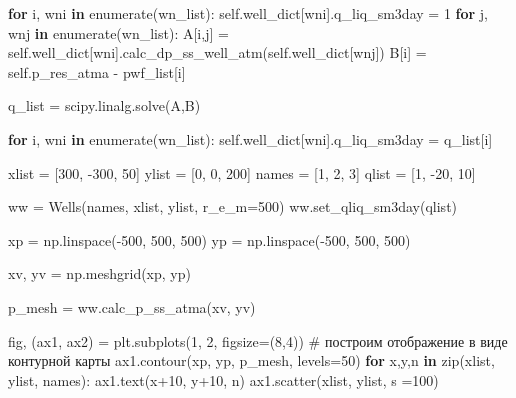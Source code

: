 \documentclass[
  russian,
  letterpaper,
  DIV=11,
  numbers=noendperiod,
  oneside]{scrartcl}
\newenvironment{Shaded}{\begin{snugshade}}{\end{snugshade}}
\newcommand{\BuiltInTok}[1]{\textcolor[rgb]{0.00,0.23,0.31}{#1}}
\newcommand{\CommentTok}[1]{\textcolor[rgb]{0.37,0.37,0.37}{#1}}
\newcommand{\ControlFlowTok}[1]{\textcolor[rgb]{0.00,0.23,0.31}{\textbf{#1}}}
\newcommand{\DecValTok}[1]{\textcolor[rgb]{0.68,0.00,0.00}{#1}}
\newcommand{\KeywordTok}[1]{\textcolor[rgb]{0.00,0.23,0.31}{\textbf{#1}}}
\newcommand{\NormalTok}[1]{\textcolor[rgb]{0.00,0.23,0.31}{#1}}
\newcommand{\OperatorTok}[1]{\textcolor[rgb]{0.37,0.37,0.37}{#1}}
\newcommand{\StringTok}[1]{\textcolor[rgb]{0.13,0.47,0.30}{#1}}
\newcommand{\VariableTok}[1]{\textcolor[rgb]{0.07,0.07,0.07}{#1}}
\begin{document}
\begin{Shaded}
\begin{Highlighting}[]
        \ControlFlowTok{for}\NormalTok{ i, wni }\KeywordTok{in} \BuiltInTok{enumerate}\NormalTok{(wn\_list):}
            \VariableTok{self}\NormalTok{.well\_dict[wni].q\_liq\_sm3day }\OperatorTok{=} \DecValTok{1}
            \ControlFlowTok{for}\NormalTok{ j, wnj }\KeywordTok{in} \BuiltInTok{enumerate}\NormalTok{(wn\_list):}
\NormalTok{                A[i,j] }\OperatorTok{=} \VariableTok{self}\NormalTok{.well\_dict[wni].calc\_dp\_ss\_well\_atm(}\VariableTok{self}\NormalTok{.well\_dict[wnj])}
\NormalTok{            B[i] }\OperatorTok{=} \VariableTok{self}\NormalTok{.p\_res\_atma }\OperatorTok{{-}}\NormalTok{ pwf\_list[i]}
        
\NormalTok{        q\_list }\OperatorTok{=}\NormalTok{ scipy.linalg.solve(A,B)}

        \ControlFlowTok{for}\NormalTok{ i, wni }\KeywordTok{in} \BuiltInTok{enumerate}\NormalTok{(wn\_list):}
            \VariableTok{self}\NormalTok{.well\_dict[wni].q\_liq\_sm3day }\OperatorTok{=}\NormalTok{ q\_list[i]}

\NormalTok{xlist }\OperatorTok{=}\NormalTok{ [}\DecValTok{300}\NormalTok{, }\OperatorTok{{-}}\DecValTok{300}\NormalTok{, }\DecValTok{50}\NormalTok{]}
\NormalTok{ylist }\OperatorTok{=}\NormalTok{ [}\DecValTok{0}\NormalTok{, }\DecValTok{0}\NormalTok{, }\DecValTok{200}\NormalTok{]}
\NormalTok{names }\OperatorTok{=}\NormalTok{ [}\StringTok{\textquotesingle{}1\textquotesingle{}}\NormalTok{, }\StringTok{\textquotesingle{}2\textquotesingle{}}\NormalTok{, }\StringTok{\textquotesingle{}3\textquotesingle{}}\NormalTok{]}
\NormalTok{qlist }\OperatorTok{=}\NormalTok{ [}\DecValTok{1}\NormalTok{, }\OperatorTok{{-}}\DecValTok{20}\NormalTok{, }\DecValTok{10}\NormalTok{]}

\NormalTok{ww }\OperatorTok{=}\NormalTok{ Wells(names, xlist, ylist, r\_e\_m}\OperatorTok{=}\DecValTok{500}\NormalTok{)}
\NormalTok{ww.set\_qliq\_sm3day(qlist)}

\NormalTok{xp }\OperatorTok{=}\NormalTok{ np.linspace(}\OperatorTok{{-}}\DecValTok{500}\NormalTok{, }\DecValTok{500}\NormalTok{, }\DecValTok{500}\NormalTok{)}
\NormalTok{yp }\OperatorTok{=}\NormalTok{ np.linspace(}\OperatorTok{{-}}\DecValTok{500}\NormalTok{, }\DecValTok{500}\NormalTok{, }\DecValTok{500}\NormalTok{)}

\NormalTok{xv, yv }\OperatorTok{=}\NormalTok{ np.meshgrid(xp, yp)}

\NormalTok{p\_mesh }\OperatorTok{=}\NormalTok{ ww.calc\_p\_ss\_atma(xv, yv)}


\NormalTok{fig, (ax1, ax2) }\OperatorTok{=}\NormalTok{ plt.subplots(}\DecValTok{1}\NormalTok{, }\DecValTok{2}\NormalTok{, figsize}\OperatorTok{=}\NormalTok{(}\DecValTok{8}\NormalTok{,}\DecValTok{4}\NormalTok{))}
\CommentTok{\# построим отображение в виде контурной карты}
\NormalTok{ax1.contour(xp, yp, p\_mesh, levels}\OperatorTok{=}\DecValTok{50}\NormalTok{)}
\ControlFlowTok{for}\NormalTok{ x,y,n }\KeywordTok{in} \BuiltInTok{zip}\NormalTok{(xlist, ylist, names):}
\NormalTok{    ax1.text(x}\OperatorTok{+}\DecValTok{10}\NormalTok{, y}\OperatorTok{+}\DecValTok{10}\NormalTok{, n)}
\NormalTok{ax1.scatter(xlist, ylist, s }\OperatorTok{=}\DecValTok{100}\NormalTok{)}



\end{Highlighting}
\end{Shaded}
\end{document}
